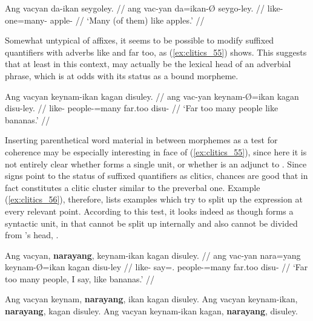 \a\label{ex:clitics_54c}\begingl
	\gla Ang vacyan da-ikan seygoley. //
	\glb ang vac-yan da=ikan-Ø seygo-ley. //
	\glc \AgtT{} like-\TplM{} one=many-\Top{} apple-\PargI{} //
	\glft `Many (of them) like apples.' //
\endgl

\xe

Somewhat untypical of affixes, it seems to be possible to modify suffixed
quantifiers with adverbs like  and 
{far too}, as (\ref{ex:clitics_55}) shows. This suggests that at least in this
context,  may actually be the lexical head
of an adverbial phrase, which is at odds with its status as a bound morpheme.

\ex\label{ex:clitics_55}\begingl
	\gla Ang vacyan keynam-ikan kagan disuley. //
	\glb ang vac-yan keynam-Ø=ikan kagan disu-ley. //
	\glc \AgtT{} like-\TplM{} people-\Top{}=many far.too disu-\PargI{} //
	\glft `Far too many people like bananas.' //
\endgl\xe

Inserting parenthetical word material in between morphemes as a test for
coherence may be especially interesting in face of (\ref{ex:clitics_55}), since
here it is not entirely clear whether  forms a single unit, or whether  is an adjunct to . Since signs
point to the status of suffixed quantifiers as clitics, chances are good that
 in fact constitutes a clitic
cluster similar to the preverbal one. Example (\ref{ex:clitics_56}), therefore,
lists examples which try to split up the expression at every relevant point.
According to this test, it looks indeed as though
 forms a syntactic unit, in that 
 cannot be split up internally and also cannot be
divided from 's head, .

\pex\label{ex:clitics_56}
\a\label{ex:clitics_56a}\begingl
	\gla Ang vacyan, \textbf{narayang}, keynam-ikan kagan disuley. //
	\glb ang vac-yan nara=yang keynam-Ø=ikan kagan disu-ley //
	\glc \AgtT{} like-\TplM{} say=\Fsg{}.\Aarg{} people-\Top{}=many far.too
		disu-\PargI{} //
	\glft `Far too many people, I say, like bananas.' //
\endgl

\a\label{ex:clitics_56b}
	\ljudge{*} Ang vacyan keynam, \textbf{narayang}, ikan kagan disuley.
\a\label{ex:clitics_56c}
	\ljudge{*} Ang vacyan keynam-ikan, \textbf{narayang}, kagan disuley.
\a\label{ex:clitics_56d}
	Ang vacyan keynam-ikan kagan, \textbf{narayang}, disuley.
\xe


